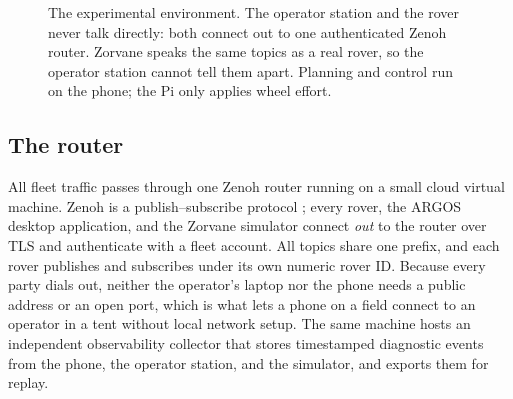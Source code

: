 \begin{figure}[ht]
\centering
{}
\caption{The experimental environment. The operator station and the rover never talk directly: both connect out to one authenticated Zenoh router. Zorvane speaks the same topics as a real rover, so the operator station cannot tell them apart. Planning and control run on the phone; the Pi only applies wheel effort.}
\label{fig:env}
\end{figure}

\subsection{The router}
\label{sec:env-router}

All fleet traffic passes through one Zenoh router running on a small cloud virtual machine.
Zenoh is a publish--subscribe protocol ; every rover, the ARGOS desktop application, and the Zorvane simulator connect \emph{out} to the router over TLS and authenticate with a fleet account.
All topics share one prefix, and each rover publishes and subscribes under its own numeric rover ID.
Because every party dials out, neither the operator's laptop nor the phone needs a public address or an open port, which is what lets a phone on a field connect to an operator in a tent without local network setup.
The same machine hosts an independent observability collector that stores timestamped diagnostic events from the phone, the operator station, and the simulator, and exports them for replay.

